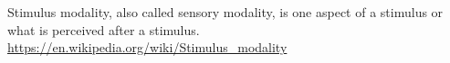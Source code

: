 \documentclass[a4paper]{article}
\title{}
\date{}
\begin{document}
    \maketitle
    Stimulus modality, also called sensory modality, is one aspect of a stimulus or what is perceived after a stimulus.
    \url{https://en.wikipedia.org/wiki/Stimulus_modality}
\end{document}
